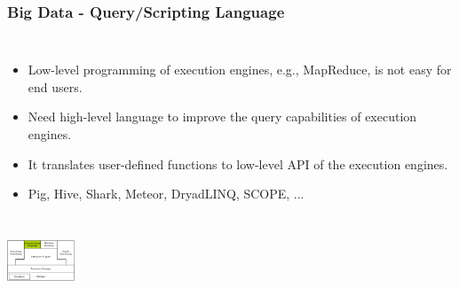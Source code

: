 \documentclass{beamer}
\begin{document}
\begin{frame}
\frametitle{Big Data - Query/Scripting Language}
\begin{columns}
\column{30em}
\begin{itemize}\itemsep1em
  \justifying
  \item \textcolor{Ocean}{Low-level} programming of execution engines, e.g., MapReduce, is \textcolor{TextGreen}{not} easy for end users.
  \item Need \textcolor{Ocean}{high-level} language to improve the query capabilities of execution engines.
  \item It translates \textcolor{TextGreen}{user-defined} functions to \textcolor{TextGreen}{low-level} API of the execution engines.
  \item Pig, Hive, Shark, Meteor, DryadLINQ, SCOPE, ...
\end{itemize}
\end{columns}
\vspace{1.33cm}
\hspace*{10cm}\includegraphics[width=2cm]{figs/stack_query.pdf}
\end{frame}
\end{document}
